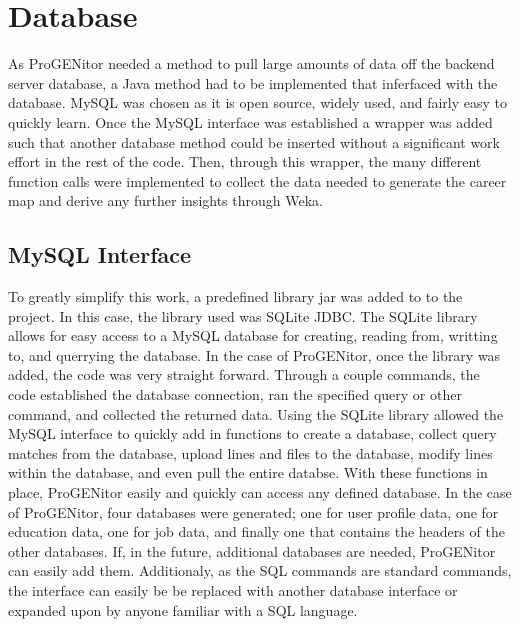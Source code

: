 \section{Database}
\label{sect:database}
As ProGENitor needed a method to pull large amounts of data off the backend
server database, a Java method had to be implemented that inferfaced with
the database.  MySQL was chosen as it is open source, widely used, and fairly
easy to quickly learn.  Once the MySQL interface was established a wrapper was
added such that another database method could be inserted without a significant
work effort in the rest of the code.  Then, through this wrapper, the many
different function calls were implemented to collect the data needed to generate
the career map and derive any further insights through Weka.

\subsection{MySQL Interface}
To greatly simplify this work, a predefined library jar was added
to to the project.  In this case, the library used was SQLite JDBC.  The SQLite
library allows for easy access to a MySQL database for creating, reading from,
writting to, and querrying the database.  In the case of ProGENitor, once the
library was added, the code was very straight forward.  Through a couple
commands, the code established the database connection, ran the specified query
or other command, and collected the returned data.\cite{sqlite}  Using the
SQLite library allowed the MySQL interface to quickly add in functions to create
a database, collect query matches from the database, upload lines and files to
the database, modify lines within the database, and even pull the entire
databse.  With these functions in place, ProGENitor easily and quickly can
access any defined database.  In the case of ProGENitor, four databases were
generated; one for user profile data, one for education data, one for job data,
and finally one that contains the headers of the other databases.  If, in the
future, additional databases are needed, ProGENitor can easily add them. 
Additionaly, as the SQL commands are standard commands, the interface can easily
be be replaced with another database interface or expanded upon by anyone
familiar with a SQL language.

